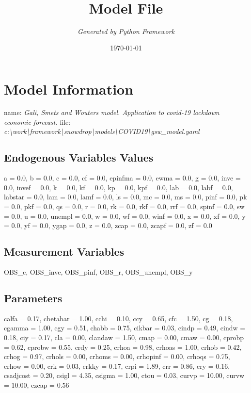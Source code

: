 \documentclass{article}%
\title{\textbf{Model File}}%
\author{\textit{Generated by Python Framework}}%
\date{\today}%
\begin{document}
%
\normalsize%
\maketitle%
\section{Model Information}%
\label{sec:ModelInformation}%
name: %
\textit{Gali, Smets and Wouters model.  Application to covid{-}19 lockdown economic forecast.}%
\newline%
file: %
\textit{c:\textbackslash{}work\textbackslash{}framework\textbackslash{}snowdrop\textbackslash{}models\textbackslash{}COVID19\textbackslash{}gsw\_model.yaml}%
\subsection{Endogenous Variables Values}%
\label{subsec:EndogenousVariablesValues}%
a = 0.0, b = 0.0, c = 0.0, cf = 0.0, epinfma = 0.0, ewma = 0.0, g = 0.0, inve = 0.0, invef = 0.0, k = 0.0, kf = 0.0, kp = 0.0, kpf = 0.0, lab = 0.0, labf = 0.0, labstar = 0.0, lam = 0.0, lamf = 0.0, ls = 0.0, mc = 0.0, ms = 0.0, pinf = 0.0, pk = 0.0, pkf = 0.0, qs = 0.0, r = 0.0, rk = 0.0, rkf = 0.0, rrf = 0.0, spinf = 0.0, sw = 0.0, u = 0.0, unempl = 0.0, w = 0.0, wf = 0.0, winf = 0.0, x = 0.0, xf = 0.0, y = 0.0, yf = 0.0, ygap = 0.0, z = 0.0, zcap = 0.0, zcapf = 0.0, zf = 0.0

%
\subsection{Measurement Variables}%
\label{subsec:MeasurementVariables}%
OBS\_c, OBS\_inve, OBS\_pinf, OBS\_r, OBS\_unempl, OBS\_y

%
\subsection{Parameters}%
\label{subsec:Parameters}%
calfa = 0.17, cbetabar = 1.00, cchi = 0.10, ccy = 0.65, cfc = 1.50, cg = 0.18, cgamma = 1.00, cgy = 0.51, chabb = 0.75, cikbar = 0.03, cindp = 0.49, cindw = 0.18, ciy = 0.17, cla = 0.00, clandaw = 1.50, cmap = 0.00, cmaw = 0.00, cprobp = 0.62, cprobw = 0.55, crdy = 0.25, crhoa = 0.98, crhoas = 1.00, crhob = 0.42, crhog = 0.97, crhols = 0.00, crhoms = 0.00, crhopinf = 0.00, crhoqs = 0.75, crhow = 0.00, crk = 0.03, crkky = 0.17, crpi = 1.89, crr = 0.86, cry = 0.16, csadjcost = 0.20, csigl = 4.35, csigma = 1.00, ctou = 0.03, curvp = 10.00, curvw = 10.00, czcap = 0.56
\end{document}

